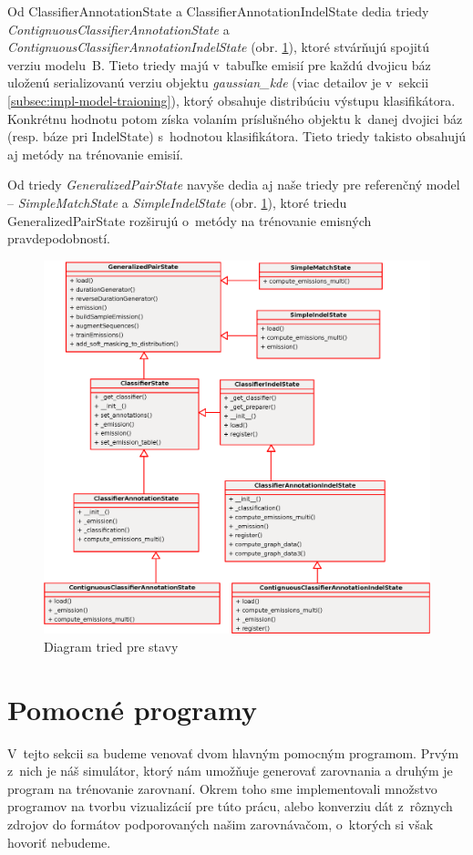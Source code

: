 Od ClassifierAnnotationState a ClassifierAnnotationIndelState dedia triedy \textit{ContignuousClassifierAnnotationState} a \textit{ContignuousClassifierAnnotationIndelState} (obr. \ref{fig:cls-states}), ktoré stvárňujú spojitú verziu modelu~B. Tieto triedy majú v~tabuľke emisií pre každú dvojicu báz uloženú serializovanú verziu objektu \textit{gaussian\_kde} (viac detailov je v~sekcii \ref{subsec:impl-model-traioning}), ktorý obsahuje distribúciu výstupu klasifikátora. Konkrétnu hodnotu potom získa volaním príslušného objektu k~danej dvojici báz (resp. báze pri IndelState) s~hodnotou klasifikátora. Tieto triedy takisto obsahujú aj metódy na trénovanie emisií.

Od triedy \textit{GeneralizedPairState} navyše dedia aj naše triedy pre referenčný model -- \textit{SimpleMatchState} a \textit{SimpleIndelState} (obr. \ref{fig:cls-states}), ktoré triedu GeneralizedPairState rozširujú o~metódy na trénovanie emisných pravdepodobností.

\begin{figure}[htp]
    \centering
    \includegraphics[width=\textwidth]{images/cls/states}
    \caption{Diagram tried pre stavy}
    \label{fig:cls-states}
\end{figure}

\section{Pomocné programy}
V~tejto sekcii sa budeme venovať dvom hlavným pomocným programom. Prvým z~nich je náš simulátor, ktorý nám umožňuje generovať zarovnania a druhým je program na trénovanie zarovnaní. Okrem toho sme implementovali množstvo programov na tvorbu vizualizácií pre túto prácu, alebo konverziu dát z~rôznych zdrojov do formátov podporovaných našim zarovnávačom, o~ktorých si však hovoriť nebudeme.
